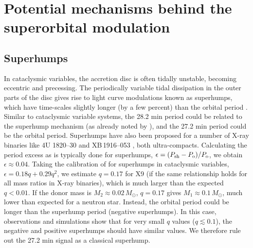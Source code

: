\documentclass[a4paper,fleqn,usenatbib]{mnras}
\begin{document}






\appendix
\section{Potential mechanisms behind the superorbital modulation}
\label{sec:mechs}

\subsection{Superhumps}

In cataclysmic variables, the accretion disc is often tidally unstable, becoming eccentric and precessing. The periodically variable tidal dissipation in the outer parts of the disc gives rise to light curve modulations known as superhumps, which have time-scales slightly longer (by a few percent) than the orbital period \citep{1988MNRAS.232...35W, 1990PASJ...42..135H}.
Similar to cataclysmic variable systems, the 28.2 min period could be related to the superhump mechanism (as already noted by \citealp{2017MNRAS.467.2199B}), and the 27.2 min period could be the orbital period. Superhumps have also been proposed for a number of X-ray binaries like 4U 1820--30 \citep{2010ApJ...712..653W} and XB\,1916--053 \citep{2002MNRAS.330L..37R}, both ultra-compacts. Calculating the period excess as is typically done for superhumps, $\epsilon = (P_{\rm sh} - P_{\rm o}) / P_{\rm o}$, we obtain $\epsilon \approx 0.04$. Taking the calibration of \citet{2005PASP..117.1204P} for superhumps in cataclysmic variables, $\epsilon = 0.18q + 0.29q^2$, we estimate $q = 0.17$ for X9 (if the same relationship holds for all mass ratios in X-ray binaries), which is much larger than the expected $q < 0.01$. If the donor mass is $M_2 \approx 0.02\,M_\odot$, $q = 0.17$ gives $M_1 \approx 0.1\,M_\odot$, much lower than expected for a neutron star. Instead, the orbital period could be longer than the superhump period (negative superhumps). In this case, observations \citep{2002MNRAS.330L..37R, 2009MNRAS.399..465O} and simulations \citep{2009MNRAS.398.2110W} show that for very small $q$ values ($q \lesssim 0.1$), the negative and positive superhumps should have similar values. We therefore rule out the 27.2 min signal as a classical superhump.
\end{document}
